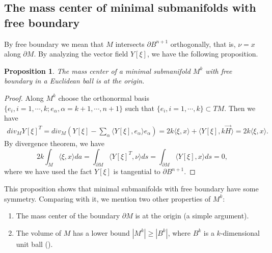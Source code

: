 \documentclass[11pt,reqno]{amsart}
\newtheorem{prop}[thm]{Proposition}
\theoremstyle{definition}
\begin{document}
\subsection{The mass center of minimal submanifolds with free boundary}

By free boundary we mean that $M$ intersects ${\partial} B^{n+1}$ orthogonally, that is, $\nu=x$ along ${\partial} M$. By analyzing the vector field $Y[\xi]$, we have the following proposition.
\begin{prop}\label{prop1}
The mass center of a minimal submanifold $M^k$ with free boundary in a Euclidean ball is at the origin.
\end{prop}

\begin{proof}
Along $M^k$ choose the orthonormal basis $\{e_i,i=1,\cdots,k;e_\alpha, \alpha=k+1,\cdots,n+1\}$ such that $\{e_i,i=1,\cdots, k\}\subset TM$. Then we have
\begin{align*}
div_M Y[\xi]^T=div_M(Y[\xi]-\sum_\alpha {\langle} Y[\xi],e_\alpha {\rangle} e_\alpha)=2k{\langle}\xi,x{\rangle}+{\langle} Y[\xi], k\vec{H}{\rangle}=2k{\langle}\xi,x{\rangle}.
\end{align*}
By divergence theorem, we have
\begin{equation*}
2k\int_M{\langle}\xi,x{\rangle} da=\int_{{\partial} M} {\langle} Y[\xi]^T,\nu{\rangle} ds=\int_{{\partial} M} {\langle} Y[\xi],x{\rangle} ds=0,
\end{equation*}
where we have used the fact $Y[\xi]$ is tangential to ${\partial} B^{n+1}$.
\end{proof}

This proposition shows that minimal submanifolds with free boundary have some symmetry. Comparing with it, we mention two other properties of $M^k$:
\begin{enumerate}
  \item The mass center of the boundary ${\partial} M$ is at the origin (a simple argument).
  \item The volume of $M$ has a lower bound $|M^k|\geq |B^k|$, where $B^k$ is a $k$-dimensional unit ball (\cite{B,FS,RV}).
\end{enumerate}
\end{document}
